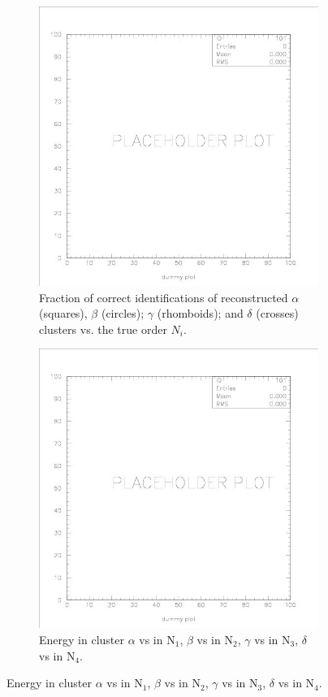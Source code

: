 \documentclass[12pt]{article}
\begin{document}
\begin{figure}[p]
\vskip-0.7in
  \centering
       \begin{subfigure}{0.495\textwidth}
            \centering
                \includegraphics[width=0.6\linewidth]{Figures/dummy.jpg}
                \caption{Fraction of correct identifications of reconstructed $\alpha$ (squares), $\beta$  (circles); $\gamma$ (rhomboids); and $\delta$ (crosses) clusters vs. the true order $N_i$.}
                \label{fig:cf_1st_plot}
        \end{subfigure}
\hfil
  \begin{subfigure}{0.495\textwidth}
                \centering
                \includegraphics[width=0.6\linewidth]{Figures/dummy.jpg}
                \caption{Energy in cluster $\alpha$ vs in N$_1$,
                $\beta$ vs in N$_2$, $\gamma$ vs in N$_3$, $\delta$ vs in
                N$_4$.}
                \label{fig:cf_2nd_plot}
        \end{subfigure}



\end{figure}
\end{document}
